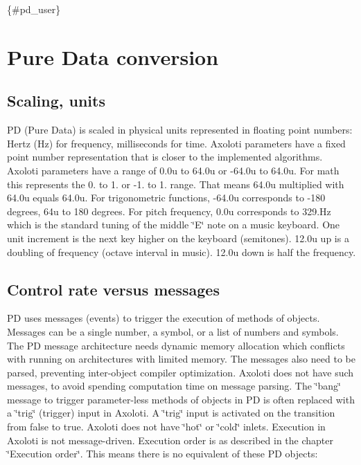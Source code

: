 \{\#pd\+\_\+user\}\hypertarget{md_pd_user_pd_user_conversion}{}\section{Pure Data conversion}\label{md_pd_user_pd_user_conversion}
\hypertarget{md_pd_user_pd_user_scaling}{}\subsection{Scaling, units}\label{md_pd_user_pd_user_scaling}
PD (Pure Data) is scaled in physical units represented in floating point numbers\+: Hertz (Hz) for frequency, milliseconds for time. Axoloti parameters have a fixed point number representation that is closer to the implemented algorithms. Axoloti parameters have a range of 0.\+0u to 64.\+0u or -\/64.\+0u to 64.\+0u. For math this represents the 0. to 1. or -\/1. to 1. range. That means 64.\+0u multiplied with 64.\+0u equals 64.\+0u. For trigonometric functions, -\/64.\+0u corresponds to -\/180 degrees, 64u to 180 degrees. For pitch frequency, 0.\+0u corresponds to 329.\+Hz which is the standard tuning of the middle \char`\"{}\+E\char`\"{} note on a music keyboard. One unit increment is the next key higher on the keyboard (semitones). 12.\+0u up is a doubling of frequency (octave interval in music). 12.\+0u down is half the frequency.\hypertarget{md_pd_user_pd_user_control_rate_vs_messages}{}\subsection{Control rate versus messages}\label{md_pd_user_pd_user_control_rate_vs_messages}
PD uses messages (events) to trigger the execution of methods of objects. Messages can be a single number, a symbol, or a list of numbers and symbols. The PD message architecture needs dynamic memory allocation which conflicts with running on architectures with limited memory. The messages also need to be parsed, preventing inter-\/object compiler optimization. Axoloti does not have such messages, to avoid spending computation time on message parsing. The \char`\"{}bang\char`\"{} message to trigger parameter-\/less methods of objects in PD is often replaced with a \char`\"{}trig\char`\"{} (trigger) input in Axoloti. A \char`\"{}trig\char`\"{} input is activated on the transition from false to true. Axoloti does not have \char`\"{}hot\char`\"{} or \char`\"{}cold\char`\"{} inlets. Execution in Axoloti is not message-\/driven. Execution order is as described in the chapter \char`\"{}\+Execution order\char`\"{}. This means there is no equivalent of these PD objects\+: 
